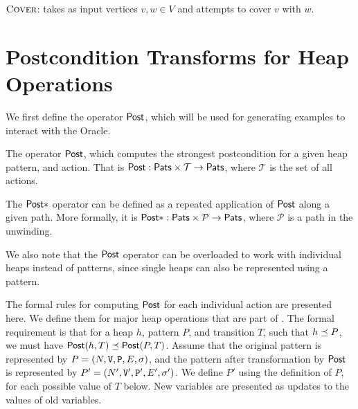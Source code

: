 \begin{algorithm}[ht]


  \caption{$\textsc{Cover}$: takes as input vertices $v, w \in V$ and attempts to cover $v$ with $w$.}
  \label{alg:heap-cover}
\end{algorithm}

\section{Postcondition Transforms for Heap Operations}
We first define the operator $\mathsf{Post}$, which will be used for generating examples to interact with the Oracle.

\begin{defn}
  \label{defn:heap-post-transforms}
  The operator $\mathsf{Post}$, which computes the strongest postcondition for a given heap pattern, and action. That is $\mathsf{Post} : \mathsf{Pats} \times \mathcal{T} \to \mathsf{Pats}$, where $\mathcal{T}$ is the set of all actions.

  The $\mathsf{Post}{*}$ operator can be defined as a repeated application of $\mathsf{Post}$ along a given path. More formally, it is $\mathsf{Post}{*} : \mathsf{Pats} \times \mathcal{P} \to \mathsf{Pats}$, where $\mathcal{P}$ is a path in the unwinding.
\end{defn}

We also note that the $\mathsf{Post}$ operator can be overloaded to work with individual heaps instead of patterns, since single heaps can also be represented using a pattern.

The formal rules for computing $\mathsf{Post}$ for each individual action are presented here. We define them for major heap operations that are part of \lang. The formal requirement is that for a heap $h$, pattern $P$, and transition $T$, such that $h \preceq P$, we must have $\mathsf{Post}(h, T) \preceq \mathsf{Post}(P, T)$. Assume that the original pattern is represented by $P = (N, \mathtt{V}, \mathtt{P}, E, \sigma)$, and the pattern after transformation by $\mathsf{Post}$ is represented by $P' = (N', \mathtt{V}', \mathtt{P}', E', \sigma')$. We define $P'$ using the definition of $P$, for each possible value of $T$ below. New variables are presented as updates to the values of old variables.

